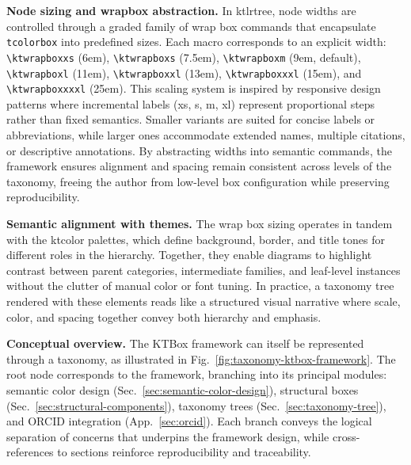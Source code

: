 \documentclass[12pt,onecolumn]{article}
\begin{document}
  \noindent\textbf{Node sizing and wrapbox abstraction.} In ktlrtree, node widths are controlled through a graded family of wrap box commands that encapsulate \texttt{tcolorbox} into predefined sizes. Each macro corresponds to an explicit width: \verb|\ktwrapboxxs| (6em), \verb|\ktwrapboxs| (7.5em), \verb|\ktwrapboxm| (9em, default), \verb|\ktwrapboxl| (11em), \verb|\ktwrapboxxl| (13em), \verb|\ktwrapboxxxl| (15em), and \verb|\ktwrapboxxxxl| (25em). This scaling system is inspired by responsive design patterns where incremental labels (xs, s, m, xl) represent proportional steps rather than fixed semantics. Smaller variants are suited for concise labels or abbreviations, while larger ones accommodate extended names, multiple citations, or descriptive annotations. By abstracting widths into semantic commands, the framework ensures alignment and spacing remain consistent across levels of the taxonomy, freeing the author from low-level box configuration while preserving reproducibility.

  \noindent\textbf{Semantic alignment with themes.} The wrap box sizing operates in tandem with the ktcolor palettes, which define background, border, and title tones for different roles in the hierarchy. Together, they enable diagrams to highlight contrast between parent categories, intermediate families, and leaf-level instances without the clutter of manual color or font tuning. In practice, a taxonomy tree rendered with these elements reads like a structured visual narrative where scale, color, and spacing together convey both hierarchy and emphasis.

  \noindent\textbf{Conceptual overview.} The KTBox framework can itself be represented through a taxonomy, as illustrated in Fig.~\ref{fig:taxonomy-ktbox-framework}. The root node corresponds to the framework, branching into its principal modules: semantic color design (Sec.~\ref{sec:semantic-color-design}), structural boxes (Sec.~\ref{sec:structural-components}), taxonomy trees (Sec.~\ref{sec:taxonomy-tree}), and ORCID integration (App.~\ref{sec:orcid}). Each branch conveys the logical separation of concerns that underpins the framework design, while cross-references to sections reinforce reproducibility and traceability.  
\end{document}

